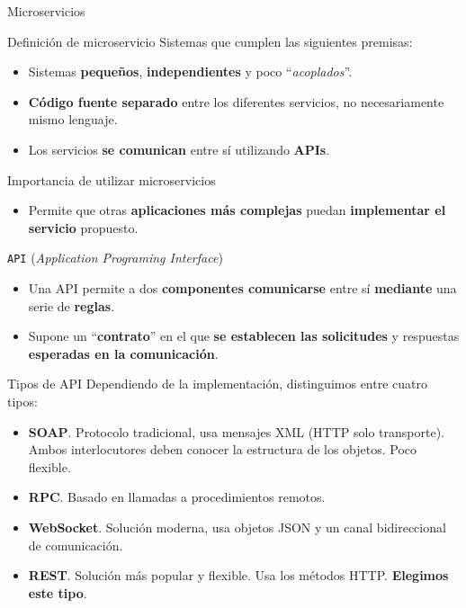 \documentclass[aspectratio=169,xcolor=dvipsnames]{beamer}
\begin{document}
	\begin{frame}{Microservicios}
		\begin{exampleblock}{Definición de microservicio}
			Sistemas que cumplen las siguientes premisas: 
			
			\begin{itemize}
				\item Sistemas \textbf{pequeños}, \textbf{independientes} y poco ``\textit{acoplados}''. 
				\item \textbf{Código fuente separado} entre los diferentes servicios, no necesariamente mismo lenguaje.
				\item Los servicios \textbf{se comunican} entre sí utilizando \textbf{APIs}.
			\end{itemize}
		\end{exampleblock}
		
		\begin{alertblock}{Importancia de utilizar microservicios}
			\begin{itemize}
				\item Permite que otras \textbf{aplicaciones más complejas} puedan \textbf{implementar el servicio} propuesto.
			\end{itemize}
		\end{alertblock}
	\end{frame}

	
	\begin{frame}{\texttt{API} \small (\textit{Application Programing Interface})}
		\begin{itemize}
			\item Una API permite a dos \textbf{componentes comunicarse} entre sí \textbf{mediante} una serie de \textbf{reglas}.
			
			\item Supone un ``\textbf{contrato}'' en el que \textbf{se establecen las solicitudes} y respuestas \textbf{esperadas en la comunicación}.
		\end{itemize}
	
		\begin{exampleblock}{Tipos de API}
			Dependiendo de la implementación, distinguimos entre cuatro tipos:
			
			\begin{itemize}
				\item \textbf{SOAP}. Protocolo tradicional, usa mensajes XML (HTTP solo transporte). Ambos interlocutores deben conocer la estructura de los objetos. Poco flexible.
				\item \textbf{RPC}. Basado en llamadas a procedimientos remotos. 
				\item \textbf{WebSocket}. Solución moderna, usa objetos JSON y un canal bidireccional de comunicación.
				\item \textbf{REST}. Solución más popular y flexible. Usa los métodos HTTP. \textbf{Elegimos este tipo}.
			\end{itemize}
		\end{exampleblock}
	\end{frame}
	
\end{document}
